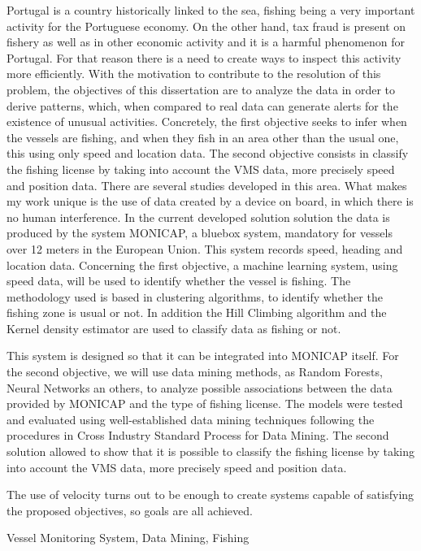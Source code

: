\abstractEN %

Portugal is a country historically linked to the sea, fishing being a very important activity for the Portuguese economy. On the other hand, tax fraud is present on fishery as well as in other economic activity and it is a harmful phenomenon for Portugal. For that reason there is a need to create ways to inspect this activity more efficiently. 
With the motivation to contribute to the resolution of this problem, the objectives of this dissertation are to analyze the data in order to derive patterns, which, when compared to real data can generate alerts for the existence of unusual activities. Concretely, the first objective seeks to infer when the vessels are fishing, and when they fish in an area other than the usual one, this using only speed and location data. The second objective consists in classify the fishing license by taking into account the VMS data, more precisely speed and position data.
There are several studies developed in this area. What makes my work unique is the use of data created by a device on board, in which there is no human interference. 
In the current developed solution  solution the data is produced by the system MONICAP, a bluebox system, mandatory for vessels over 12 meters in the European Union. This system records speed, heading and location data.
Concerning the first objective, a machine learning system, using speed data, will be used to identify whether the vessel is fishing. The methodology used is based  in clustering algorithms, to identify whether the fishing zone is usual or not.  In addition the Hill Climbing algorithm and the Kernel density estimator are used to classify data as fishing or not.

This system is designed so that it can be integrated into MONICAP itself. For the second objective, we will use data mining methods, as Random Forests, Neural Networks an others, to analyze possible associations between the data provided by MONICAP and the type of fishing
license.
The models were tested and evaluated using well-established data mining techniques following the procedures in Cross Industry Standard Process for Data Mining.
The second solution allowed to show that it is possible to classify the fishing license by taking into account the VMS data, more precisely speed and position data.

The use of velocity turns out to be enough to create systems capable of satisfying the proposed objectives, so goals are all achieved.



\begin{keywords}
Vessel Monitoring System, Data Mining, Fishing
\end{keywords} 
